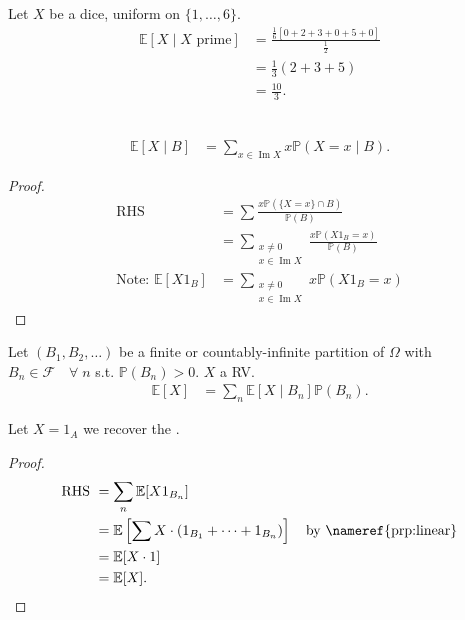 \begin{example}
    Let $X$ be a dice, uniform on $\{1, \dots, 6\}$.
    \begin{align*}
        \mathbb{E}[X \mid X \text{ prime}] &= \frac{\frac{1}{6} [0 + 2 + 3 + 0 + 5 + 0]}{\frac{1}{2}} \\
        &= \frac{1}{3} (2 + 3 + 5) \\
        &= \frac{10}{3}.
    \end{align*} 
\end{example} 

\begin{definition} ~\vspace*{-1.5\baselineskip}
    \begin{align*}
        \mathbb{E}[X \mid B] &= \sum_{x \in \operatorname{Im} X} x \mathbb{P}(X = x \mid B).
    \end{align*} 
\end{definition} 

\begin{proof}
    \begin{align*}
        \text{RHS } &= \sum \frac{x \mathbb{P}(\{X = x\} \cap B)}{\mathbb{P}(B)} \\
        &= \sum_{\substack{x \neq 0 \\ x \in \operatorname{Im} X}} \frac{x \mathbb{P}(X 1_B = x)}{\mathbb{P}(B)} \\
        \text{Note: } \mathbb{E}[X 1_B] &= \sum_{\substack{x \neq 0 \\ x \in \operatorname{Im} X}} x \mathbb{P}(X 1_B = x)
    \end{align*} 
\end{proof} 

\begin{proposition} \label{prp:lte}
    Let $(B_1, B_2, \dots)$ be a finite or countably-infinite partition of $\Omega$ with $B_n \in \mathcal{F} \quad \forall \; n$ s.t. $\mathbb{P}(B_n) > 0$.
    $X$ a RV.
    \begin{align*}
        \mathbb{E}[X] &= \sum_n \mathbb{E}[X \mid B_n] \mathbb{P}(B_n).
    \end{align*} 
\end{proposition} 

\begin{example}
    Let $X = 1_A$ we recover the .
\end{example} 

\begin{proof}
    \begin{align*}
        \text{RHS } &= \sum_n \mathbb{E}[X 1_{B_n}] \\
        &= \mathbb{E}\left[ \sum X \cdot (1_{B_1} + \dots + 1_{B_n}) \right] \quad \text{by \nameref{prp:linear}}\\
        &= \mathbb{E}[X \cdot 1] \\
        &= \mathbb{E}[X].
    \end{align*} 
\end{proof} 

